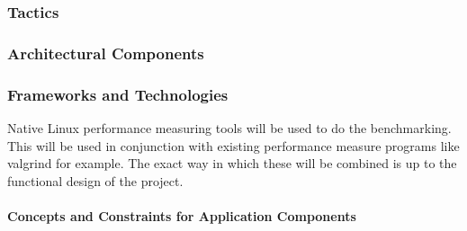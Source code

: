 \subsubsection{Tactics}

\subsubsection{Architectural Components}

\subsubsection{Frameworks and Technologies}
Native Linux performance measuring tools will be used to do the benchmarking.
This will be used in conjunction with existing performance measure programs
like valgrind for example. The exact way in which these will be combined is
up to the functional design of the project.

\paragraph{Concepts and Constraints for Application Components}
